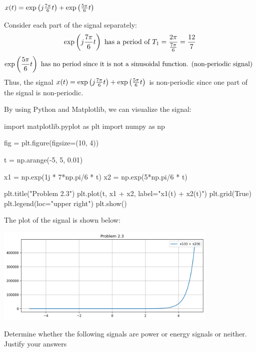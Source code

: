 \documentclass[a4paper, 10pt]{article}
\begin{document}
\newpage

\begin{subproblems}[start=3]
    \item \( x(t) = \exp \left( j\frac{7\pi}{6}t \right) +  \exp \left( \frac{5\pi}{6}t \right) \)
\end{subproblems}

\begin{solution}
Consider each part of the signal separately:
\[
\exp \left( j\frac{7\pi}{6}t \right) \text{ has a period of } T_1 = \frac{2\pi}{\frac{7\pi}{6}} = \frac{12}{7}
\]
\[
\exp \left( \frac{5\pi}{6}t \right) \text{ has no period since it is not a sinusoidal function. (non-periodic signal) }
\]
Thus, the signal \( x(t) = \exp \left( j\frac{7\pi}{6}t \right) +  \exp \left( \frac{5\pi}{6}t \right) \) is non-periodic since one part of the signal is non-periodic.

\vspace{5mm}

By using Python and Matplotlib, we can visualize the signal:
\begin{codingbox}
import matplotlib.pyplot as plt
import numpy as np

fig = plt.figure(figsize=(10, 4))

t = np.arange(-5, 5, 0.01)

x1 = np.exp(1j * 7*np.pi/6 * t)
x2 = np.exp(5*np.pi/6 * t)

plt.title("Problem 2.3")
plt.plot(t, x1 + x2, label="x1(t) + x2(t)")
plt.grid(True)
plt.legend(loc="upper right")
plt.show()
\end{codingbox}
The plot of the signal is shown below:
\begin{center}
    \includegraphics[width=0.8\textwidth]{images/problem_2_3.png}
\end{center}
\end{solution}

\newpage

\begin{problem}
Determine whether the following signals are power or energy signals or neither. Justify your answers
\end{problem}
\end{document}
